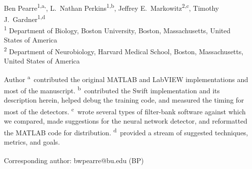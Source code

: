 \documentclass[10pt,letterpaper]{article}
\date{}
\begin{document}
\vspace*{0.35in}

\begin{flushleft}
{\Large
\textbf{}
}
\newline
\\
Ben Pearre\textsuperscript{1,a,\textcurrency},
L.~Nathan Perkins\textsuperscript{1,b},
Jeffrey E.~Markowitz\textsuperscript{2,c},
Timothy J.~Gardner\textsuperscript{1,d}
\\
\bigskip
\textsuperscript{1} Department of Biology, Boston University, Boston, Massachusetts, United States of America\\
\textsuperscript{2} Department of Neurobiology, Harvard Medical School, Boston, Massachusetts, United States of America
\\
\bigskip

% 
%
Author \textsuperscript{a}~contributed the original MATLAB and LabVIEW implementations and most of the manuscript.
\textsuperscript{b}~contributed the Swift implementation and its description herein, helped debug the training code, and measured the timing for most of the detectors.
\textsuperscript{c}~wrote several types of filter-bank software against which we compared, made suggestions for the neural network detector, and reformatted the MATLAB code for distribution.
\textsuperscript{d}~provided a stream of suggested techniques, metrics, and goals.





\textsuperscript{\textcurrency} Corresponding author: bwpearre@bu.edu (BP)

\end{flushleft}
\end{document}
